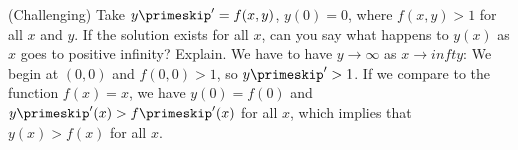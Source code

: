 {(Challenging) Take $y\primeskip' = f(x,y)$, $y(0) = 0$, where $f(x,y) > 1$
for all $x$ and $y$.  If
the solution exists for all $x$, can you say
what happens to $y(x)$ as $x$ goes to positive infinity?  Explain.}
{We have to have $y\to \infty$ as $x\to infty$: We begin at $(0,0)$ and $f(0,0)>1$, so $y\primeskip'>1$. If we compare to the function $f(x)=x$, we have $y(0)=f(0)$ and $y\primeskip'(x)>f\primeskip'(x)$ for all $x$, which implies that $y(x)>f(x)$ for all $x$.}